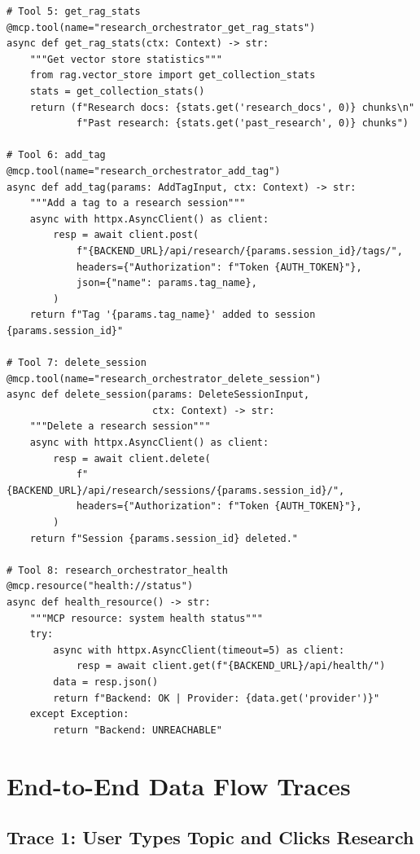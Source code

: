 \documentclass[11pt,a4paper,twoside]{report}
\begin{document}
\begin{lstlisting}[style=pythonstyle,caption={mcp\_server.py --- All 8 MCP Tools}]
# Tool 5: get_rag_stats
@mcp.tool(name="research_orchestrator_get_rag_stats")
async def get_rag_stats(ctx: Context) -> str:
    """Get vector store statistics"""
    from rag.vector_store import get_collection_stats
    stats = get_collection_stats()
    return (f"Research docs: {stats.get('research_docs', 0)} chunks\n"
            f"Past research: {stats.get('past_research', 0)} chunks")

# Tool 6: add_tag
@mcp.tool(name="research_orchestrator_add_tag")
async def add_tag(params: AddTagInput, ctx: Context) -> str:
    """Add a tag to a research session"""
    async with httpx.AsyncClient() as client:
        resp = await client.post(
            f"{BACKEND_URL}/api/research/{params.session_id}/tags/",
            headers={"Authorization": f"Token {AUTH_TOKEN}"},
            json={"name": params.tag_name},
        )
    return f"Tag '{params.tag_name}' added to session {params.session_id}"

# Tool 7: delete_session
@mcp.tool(name="research_orchestrator_delete_session")
async def delete_session(params: DeleteSessionInput,
                         ctx: Context) -> str:
    """Delete a research session"""
    async with httpx.AsyncClient() as client:
        resp = await client.delete(
            f"{BACKEND_URL}/api/research/sessions/{params.session_id}/",
            headers={"Authorization": f"Token {AUTH_TOKEN}"},
        )
    return f"Session {params.session_id} deleted."

# Tool 8: research_orchestrator_health
@mcp.resource("health://status")
async def health_resource() -> str:
    """MCP resource: system health status"""
    try:
        async with httpx.AsyncClient(timeout=5) as client:
            resp = await client.get(f"{BACKEND_URL}/api/health/")
        data = resp.json()
        return f"Backend: OK | Provider: {data.get('provider')}"
    except Exception:
        return "Backend: UNREACHABLE"
\end{lstlisting}



\chapter{End-to-End Data Flow Traces}

\section{Trace 1: User Types Topic and Clicks Research}
\end{document}
